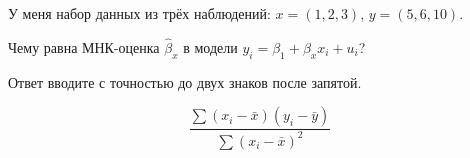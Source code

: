 
\begin{question}
У меня набор данных из трёх наблюдений: \(x = (1, 2, 3)\), \(y = (5, 6, 10)\).

Чему равна МНК-оценка \(\hat\beta_x\) в модели \(y_i = \beta_1 + \beta_x x_i + u_i\)?

Ответ вводите с точностью до двух знаков после запятой.
\end{question}

\begin{solution}
\[\frac{\sum (x_i - \bar x)(y_i - \bar y)}{\sum (x_i - \bar x)^2}\]
\end{solution}

